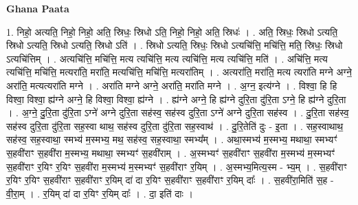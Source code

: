 \documentclass[17pt]{extarticle}
\begin{document}
\textbf{Ghana Paata } \newline

1. निहो॒ अत्यति॒ निहो॒ निहो॒ अति॒ स्रिधः॒ स्रिधो ऽति॒ निहो॒ निहो॒ अति॒ स्रिधः॑ । . अति॒ स्रिधः॒ स्रिधो ऽत्यति॒ स्रिधो ऽत्यति॒ स्रिधो ऽत्यति॒ स्रिधो ऽति॑ । . स्रिधो ऽत्यति॒ स्रिधः॒ स्रिधो ऽत्यचि॑त्ति॒ मचि॑त्ति॒ मति॒ स्रिधः॒ स्रिधो ऽत्यचि॑त्तिम् । . अत्यचि॑त्ति॒ मचि॑त्ति॒ मत्य त्यचि॑त्ति॒ मत्य त्यचि॑त्ति॒ मत्य त्यचि॑त्ति॒ मति॑ । . अचि॑त्ति॒ मत्य त्यचि॑त्ति॒ मचि॑त्ति॒ मत्यरा॑ति॒ मरा॑ति॒ मत्यचि॑त्ति॒ मचि॑त्ति॒ मत्यरा॑तिम् । . अत्यरा॑ति॒ मरा॑ति॒ मत्य त्यरा॑ति मग्ने अग्ने॒ अरा॑ति॒ मत्यत्यरा॑ति मग्ने । . अरा॑ति मग्ने अग्ने॒ अरा॑ति॒ मरा॑ति मग्ने । . अ॒ग्न॒ इत्य॑ग्ने । . विश्वा॒ हि हि विश्वा॒ विश्वा॒ ह्य॑ग्ने अग्ने॒ हि विश्वा॒ विश्वा॒ ह्य॑ग्ने । . ह्य॑ग्ने अग्ने॒ हि ह्य॑ग्ने दुरि॒ता दु॑रि॒ता ऽग्ने॒ हि ह्य॑ग्ने दुरि॒ता । . अ॒ग्ने॒ दु॒रि॒ता दु॑रि॒ता ऽग्ने॑ अग्ने दुरि॒ता सह॑स्व॒ सह॑स्व दुरि॒ता ऽग्ने॑ अग्ने दुरि॒ता सह॑स्व । . दु॒रि॒ता सह॑स्व॒ सह॑स्व दुरि॒ता दु॑रि॒ता सह॒स्वा थाथ॒ सह॑स्व दुरि॒ता दु॑रि॒ता सह॒स्वाथ॑ । . दु॒रि॒तेति॑ दुः - इ॒ता । . सह॒स्वाथाथ॒ सह॑स्व॒ सह॒स्वाथा॒ स्मभ्य॑ म॒स्मभ्य॒ मथ॒ सह॑स्व॒ सह॒स्वाथा॒ स्मभ्य᳚म् । . अथा॒स्मभ्य॑ म॒स्मभ्य॒ मथाथा॒ स्मभ्यꣳ॑ स॒हवी॑राꣳ स॒हवी॑रा म॒स्मभ्य॒ मथाथा॒ स्मभ्यꣳ॑ स॒हवी॑राम् । . अ॒स्मभ्यꣳ॑ स॒हवी॑राꣳ स॒हवी॑रा म॒स्मभ्य॑ म॒स्मभ्यꣳ॑ स॒हवी॑राꣳ र॒यिꣳ र॒यिꣳ स॒हवी॑रा म॒स्मभ्य॑ म॒स्मभ्यꣳ॑ स॒हवी॑राꣳ र॒यिम् । . अ॒स्मभ्य॒मित्य॒स्म - भ्य॒म् । . स॒हवी॑राꣳ र॒यिꣳ र॒यिꣳ स॒हवी॑राꣳ स॒हवी॑राꣳ र॒यिम् दा॑ दा र॒यिꣳ स॒हवी॑राꣳ स॒हवी॑राꣳ र॒यिम् दाः᳚ । . स॒हवी॑रा॒मिति॑ स॒ह - वी॒रा॒म् । . र॒यिम् दा॑ दा र॒यिꣳ र॒यिम् दाः᳚ । . दा॒ इति॑ दाः । \newline
\end{document}
